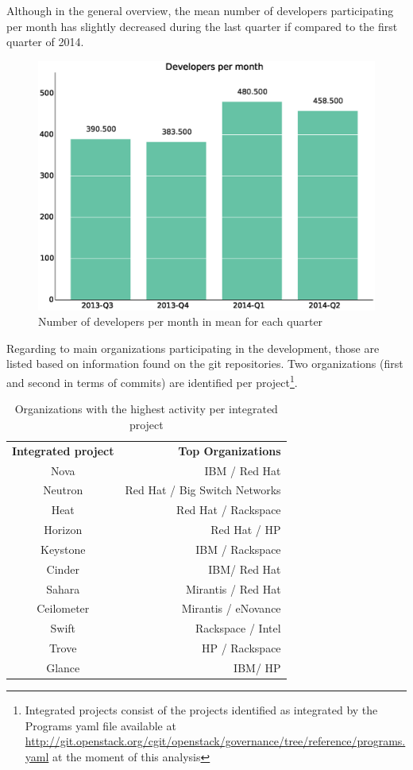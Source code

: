 \documentclass[a4wide,11pt]{report}
\begin{document}
Although in the general overview, the mean number of developers participating per month has slightly decreased during the last quarter if compared to the first quarter of 2014.

\begin{figure}[H]
    \centering
    \includegraphics[scale=.35]{figs/authors_month.eps}
\caption{Number of developers per month in mean for each quarter}
\end{figure}

Regarding to main organizations participating in the development, those are listed based on information found on the git repositories. Two organizations (first and second in terms of commits) are identified per project\footnote{Integrated projects consist of the projects identified as integrated by the Programs yaml file available at \url{http://git.openstack.org/cgit/openstack/governance/tree/reference/programs.yaml} at the moment of this analysis}.


\begin{table}[H]
\centering
\begin{tabular}{c|r|} 
\textbf{Integrated project} & \textbf{Top Organizations} \\
Nova & IBM / Red Hat\\
Neutron & Red Hat / Big Switch Networks\\
Heat & Red Hat / Rackspace\\
Horizon & Red Hat / HP\\
Keystone & IBM / Rackspace\\
Cinder & IBM/ Red Hat\\
Sahara & Mirantis / Red Hat\\
Ceilometer & Mirantis / eNovance\\
Swift & Rackspace / Intel\\
Trove & HP / Rackspace\\
Glance & IBM/ HP\\
\end{tabular}
\caption{Organizations with the highest activity per integrated project}
\end{table}
\end{document}
